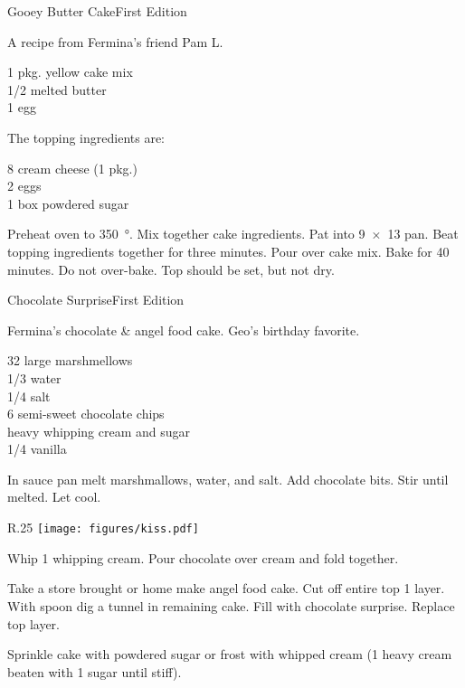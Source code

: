 \begin{entry}{Gooey Butter Cake}{First Edition}

\begin{open}
  A recipe from Fermina's friend Pam L.
\end{open}
\begin{ingredients}
  1 pkg. yellow cake mix\\
  \SI{1/2}{\cup} melted butter\\
  1 egg
\end{ingredients}
The topping ingredients are:
\begin{ingredients}
  \SI{8}{\ounce} cream cheese (1 pkg.)\\
  2 eggs\\
  1 box powdered sugar
\end{ingredients}
Preheat oven to \SI{350}{\degree}.  Mix together cake ingredients.  Pat into
\SI{9x13}{\inch} pan.  Beat topping ingredients together for three minutes.
Pour over cake mix.  Bake for 40 minutes.  Do not over-bake. Top should be
set, but not dry.
\end{entry}

\begin{entry}{Chocolate Surprise}{First Edition}

\begin{open}
  Fermina's chocolate \& angel food cake.  Geo's birthday favorite.
\end{open}
\begin{ingredients}
  32 large marshmellows\\
  \SI{1/3}{\cup} water\\
  \SI{1/4}{\teaspoon} salt\\
  \SI{6}{\ounce} semi-sweet chocolate chips\\
  heavy whipping cream and sugar\\
  \SI{1/4}{\teaspoon} vanilla
\end{ingredients}
In sauce pan melt marshmallows, water, and salt.  Add chocolate bits.  Stir
until melted.  Let cool.

\begin{wrapfigure}{R}{.25\textwidth}
\centering\texttt{[image: figures/kiss.pdf]}
\end{wrapfigure}

Whip \SI{1}{\cup} whipping cream.  Pour chocolate over cream and fold
together.

Take a store brought or home make angel food cake.  Cut off entire top
\SI{1}{\inch} layer.  With spoon dig a tunnel in remaining cake.  Fill with
chocolate surprise.  Replace top layer.

Sprinkle cake with powdered sugar or frost with whipped cream (\SI{1}{\cup}
heavy cream beaten with \SI{1}{\tblspoon} sugar until stiff).
\end{entry}

